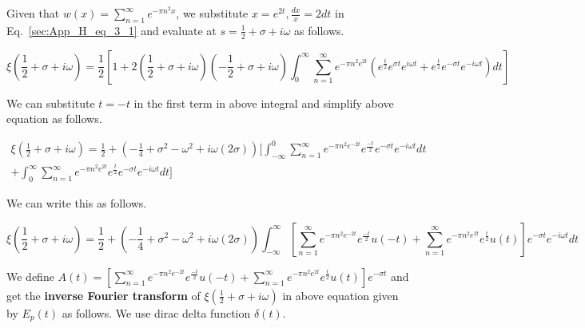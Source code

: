 \documentclass[11pt]{elsarticle}
\begin{document}
Given that $w(x) = \sum\limits_{n=1}^{\infty} e^{- \pi n^{2}x }$, we substitute $x= e^{2t}, \frac{dx}{x}= 2 dt$ in Eq.~\ref{sec:App_H_eq_3_1} and evaluate at  $s= \frac{1}{2} + \sigma + i \omega$ as follows.

\begin{equation}  \label{sec:App_H_eq_4} 
\xi(\frac{1}{2}  + \sigma + i \omega) =   \frac{1}{2} [ 1 +  2 (\frac{1}{2} + \sigma + i \omega) (-\frac{1}{2} + \sigma + i \omega)  \int_{0}^{\infty}  \sum\limits_{n=1}^{\infty} e^{- \pi n^{2} e^{2t} }  ( e^{\frac{t}{2}} e^{\sigma t} e^{ i \omega t} +  e^{\frac{t}{2}} e^{-\sigma t} e^{ -i \omega t} )  dt   ]
\end{equation}

We can substitute $t=-t$ in the first term in above integral and simplify above equation as follows.

\begin{eqnarray*}\label{sec:App_H_eq_5} 
\xi(\frac{1}{2}  + \sigma + i \omega) =   \frac{1}{2}  +   (- \frac{1}{4} +  \sigma^{2} -  \omega^{2} + i \omega (2 \sigma)  )  [ \int_{-\infty}^{0}  \sum\limits_{n=1}^{\infty} e^{- \pi n^{2} e^{-2t} }  e^{\frac{-t}{2}} e^{-\sigma t} e^{ -i \omega t} dt \\
+ \int_{0}^{\infty}  \sum\limits_{n=1}^{\infty} e^{- \pi n^{2} e^{2t} }   e^{\frac{t}{2}} e^{-\sigma t} e^{ -i \omega t}   dt  ] 
\end{eqnarray*}
\begin{equation} \end{equation}

We can write this as follows.

\begin{equation}  \label{sec:App_H_eq_6} 
\xi(\frac{1}{2}  + \sigma + i \omega) =   \frac{1}{2}  +   (- \frac{1}{4} +  \sigma^{2} -  \omega^{2} + i \omega (2 \sigma)  )   \int_{-\infty}^{\infty} [ \sum\limits_{n=1}^{\infty} e^{- \pi n^{2} e^{-2t} }  e^{\frac{-t}{2}} u(-t) + \sum\limits_{n=1}^{\infty} e^{- \pi n^{2} e^{2t} }   e^{\frac{t}{2}}   u(t) ]  e^{-\sigma t} e^{ -i \omega t} dt 
\end{equation}

We define $A(t) =  [ \sum\limits_{n=1}^{\infty} e^{- \pi n^{2} e^{-2t} }  e^{\frac{-t}{2}} u(-t) + \sum\limits_{n=1}^{\infty} e^{- \pi n^{2} e^{2t} }   e^{\frac{t}{2}}   u(t) ]  e^{-\sigma t}  $ and get the \textbf{inverse Fourier transform} of $\xi(\frac{1}{2} + \sigma + i \omega)$ in above equation given by $E_p(t)$ as follows. We use dirac delta function  $ \delta(t) $.
\end{document}
